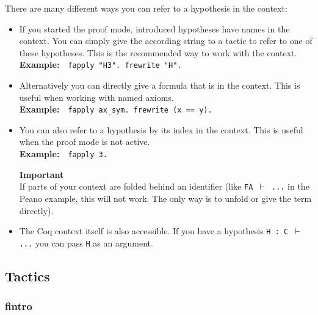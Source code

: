 \documentclass[12pt, a4paper]{article}
\newcommand{\coq}[1]{\texttt{#1}}
\newcommand{\important}[1]{
	\vspace{3pt}
	\begin{boximportant}
		\parbox{\textwidth}{\textcolor{colorimportant}{\textbf{Important}\\#1}}
	\end{boximportant}}
\newcommand{\example}[1]{\medskip\\\textbf{Example:}~~#1}
\begin{document}
There are many different ways you can refer to a hypothesis in the context:
\begin{itemize}
	\item 
	If you started the proof mode, introduced hypotheses have names in the context. 
	You can simply give the according string to a tactic to refer to one of these hypotheses. 
	This is the recommended way to work with the context.
	\example{\coq{fapply "H3". frewrite "H".}}
	
	\item 
	Alternatively you can directly give a formula that is in the context. 
	This is useful when working with named axioms.
	\example{\coq{fapply ax_sym. frewrite (x == y).}}
	
	\item 
	You can also refer to a hypothesis by its index in the context. 
	This is useful when the proof mode is not active.
	\example{\coq{fapply 3.}}
	\important{If parts of your context are folded behind an identifier (like \texttt{FA $\vdash$ ...} in the Peano example, this will not work. The only way is to unfold or give the term directly).}
	
	\item 
	The Coq context itself is also accessible. 
	If you have a hypothesis \texttt{H : C $\vdash$ ...} you can pass \texttt{H} as an argument.
\end{itemize}




\subsection{Tactics}

\subsubsection{\ttfamily fintro}
\end{document}
